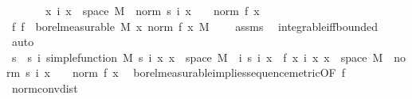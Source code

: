 \begin{isabellebody}
\ \ \ \ \ \ \ {\isachardoublequoteopen}{\isasymAnd}x\ i{\isachardot}{\kern0pt}\ x\ {\isasymin}\ space\ M\ {\isasymLongrightarrow}\ norm\ {\isacharparenleft}{\kern0pt}s\ i\ x{\isacharparenright}{\kern0pt}\ {\isasymle}\ {}\ {\isacharasterisk}{\kern0pt}\ norm\ {\isacharparenleft}{\kern0pt}f\ x{\isacharparenright}{\kern0pt}{\isachardoublequoteclose}\isanewline
%
\isadelimproof
%
\endisadelimproof
%
\isatagproof
{}\isamarkupfalse%
{\isacharminus}{\kern0pt}\isanewline
\ \ \isamarkupfalse%
\ f{\isacharcolon}{\kern0pt}\ {\isachardoublequoteopen}f\ {\isasymin}\ borel{\isacharunderscore}{\kern0pt}measurable\ M{\isachardoublequoteclose}\ {\isachardoublequoteopen}{\isacharparenleft}{\kern0pt}{\isasymintegral}\isactrlsup {\isacharplus}{\kern0pt}x{\isachardot}{\kern0pt}\ norm\ {\isacharparenleft}{\kern0pt}f\ x{\isacharparenright}{\kern0pt}\ {\isasympartial}M{\isacharparenright}{\kern0pt}\ {\isacharless}{\kern0pt}\ {\isasyminfinity}{\isachardoublequoteclose}\ \isamarkupfalse%
\ assms\ \isamarkupfalse%
\ integrable{\isacharunderscore}{\kern0pt}iff{\isacharunderscore}{\kern0pt}bounded\ \isamarkupfalse%
\ auto\isanewline
\ \ \isamarkupfalse%
\ s\ \ s{\isacharcolon}{\kern0pt}\ {\isachardoublequoteopen}{\isasymAnd}i{\isachardot}{\kern0pt}\ simple{\isacharunderscore}{\kern0pt}function\ M\ {\isacharparenleft}{\kern0pt}s\ i{\isacharparenright}{\kern0pt}{\isachardoublequoteclose}\ {\isachardoublequoteopen}{\isasymAnd}x{\isachardot}{\kern0pt}\ x\ {\isasymin}\ space\ M\ {\isasymLongrightarrow}\ {\isacharparenleft}{\kern0pt}{\isasymlambda}i{\isachardot}{\kern0pt}\ s\ i\ x{\isacharparenright}{\kern0pt}\ {\isasymlonglonglongrightarrow}\ f\ x{\isachardoublequoteclose}\ {\isachardoublequoteopen}{\isasymAnd}i\ x{\isachardot}{\kern0pt}\ x\ {\isasymin}\ space\ M\ {\isasymLongrightarrow}\ norm\ {\isacharparenleft}{\kern0pt}s\ i\ x{\isacharparenright}{\kern0pt}\ {\isasymle}\ {}\ {\isacharasterisk}{\kern0pt}\ norm\ {\isacharparenleft}{\kern0pt}f\ x{\isacharparenright}{\kern0pt}{\isachardoublequoteclose}\ \isamarkupfalse%
\ borel{\isacharunderscore}{\kern0pt}measurable{\isacharunderscore}{\kern0pt}implies{\isacharunderscore}{\kern0pt}sequence{\isacharunderscore}{\kern0pt}metric{\isacharbrackleft}{\kern0pt}OF\ f{\isacharparenleft}{\kern0pt}{}{\isacharparenright}{\kern0pt}{\isacharbrackright}{\kern0pt}\ \isamarkupfalse%
\ norm{\isacharunderscore}{\kern0pt}conv{\isacharunderscore}{\kern0pt}dist\ \isamarkupfalse%

\end{isabellebody}
